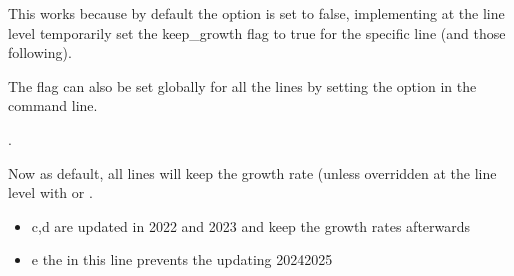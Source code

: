 \documentclass[letterpaper,10pt,english]{jupyterBook}
\begin{document}
\sphinxAtStartPar
This works because by default the option  is set to false, implementing  at the line level temporarily set the keep\_growth flag to  true for the specific line (and those following).

\sphinxAtStartPar
The  flag can also be set globally for all the lines by setting the option in the command line.

\sphinxAtStartPar
{}.

\sphinxAtStartPar
Now as default, all lines will keep the growth rate (unless overridden at the line level with  or .
\begin{itemize}
\item {} 
\sphinxAtStartPar
c,d are updated in 2022 and 2023 and keep the growth rates afterwards

\item {} 
\sphinxAtStartPar
e the  in this line prevents the updating 2024\sphinxhyphen{}2025

\end{itemize}
\end{document}
